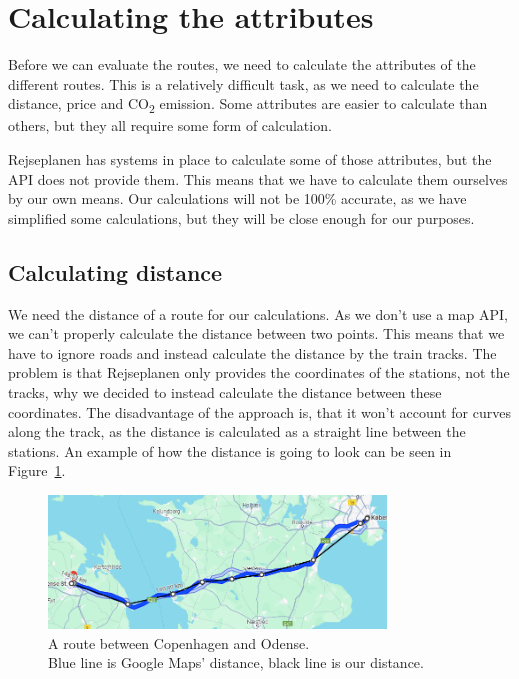 \section{Calculating the attributes}\label{sec:calculations}

Before we can evaluate the routes, we need to calculate the attributes of the different routes.
This is a relatively difficult task, as we need to calculate the distance, price and \unit{CO_{2}} emission.
Some attributes are easier to calculate than others, but they all require some form of calculation.

Rejseplanen has systems in place to calculate some of those attributes, but the API does not provide them.
This means that we have to calculate them ourselves by our own means.
Our calculations will not be 100\% accurate, as we have simplified some calculations, but they will be close
enough for our purposes.

\subsection{Calculating distance}\label{subsec:calculating-distance}

We need the distance of a route for our calculations.
As we don't use a map API, we can't properly calculate the distance between two points.
This means that we have to ignore roads and instead calculate the distance by the train tracks.
The problem is that Rejseplanen only provides the coordinates of the stations, not the tracks, why we decided to instead
calculate the distance between these coordinates.
The disadvantage of the approach is, that it won't account for curves along the track, as the distance is calculated as
a straight line between the stations.
An example of how the distance is going to look can be seen in Figure~\ref{fig:image-google-maps-distance-calculation}.


\begin{figure}[H]
    \centering
    \includegraphics[width=0.8\textwidth]{images/google-maps-distance-calculation}
    \caption{A route between Copenhagen and Odense. \\ Blue line is Google Maps' distance, black line is our distance.}
    \label{fig:image-google-maps-distance-calculation}
\end{figure}

